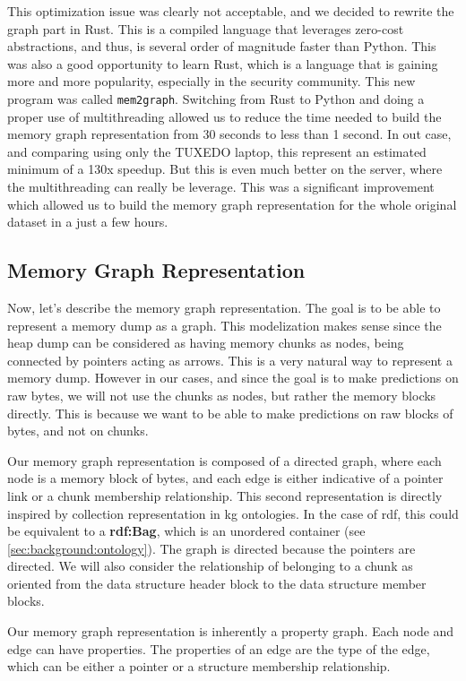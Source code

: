 This optimization issue was clearly not acceptable, and we decided to rewrite the graph part in Rust. This is a compiled language that leverages zero-cost abstractions, and thus, is several order of magnitude faster than Python. This was also a good opportunity to learn Rust, which is a language that is gaining more and more popularity, especially in the security community. This new program was called \texttt{mem2graph}. Switching from Rust to Python and doing a proper use of multithreading allowed us to reduce the time needed to build the memory graph representation from 30 seconds to less than 1 second. In out case, and comparing using only the TUXEDO laptop, this represent an estimated minimum of a 130x speedup. But this is even much better on the server, where the multithreading can really be leverage. This was a significant improvement which allowed us to build the memory graph representation for the whole original dataset in a just a few hours.

\subsection{Memory Graph Representation}
Now, let's describe the memory graph representation. The goal is to be able to represent a memory dump as a graph. This modelization makes sense since the heap dump can be considered as having memory chunks as nodes, being connected by pointers acting as arrows. This is a very natural way to represent a memory dump. However in our cases, and since the goal is to make predictions on raw bytes, we will not use the chunks as nodes, but rather the memory blocks directly. This is because we want to be able to make predictions on raw blocks of bytes, and not on chunks. 

Our memory graph representation is composed of a directed graph, where each node is a memory block of bytes, and each edge is either indicative of a pointer link or a chunk membership relationship. This second representation is directly inspired by collection representation in \acrlong{kg} ontologies. In the case of \acrshort{rdf}, this could be equivalent to a \textbf{rdf:Bag}, which is an unordered container \cite{OrderedDataInRDF20} (see \ref{sec:background:ontology}). The graph is directed because the pointers are directed. We will also consider the relationship of belonging to a chunk as oriented from the data structure header block to the data structure member blocks.

Our memory graph representation is inherently a property graph. Each node and edge can have properties. The properties of an edge are the type of the edge, which can be either a pointer or a structure membership relationship.


